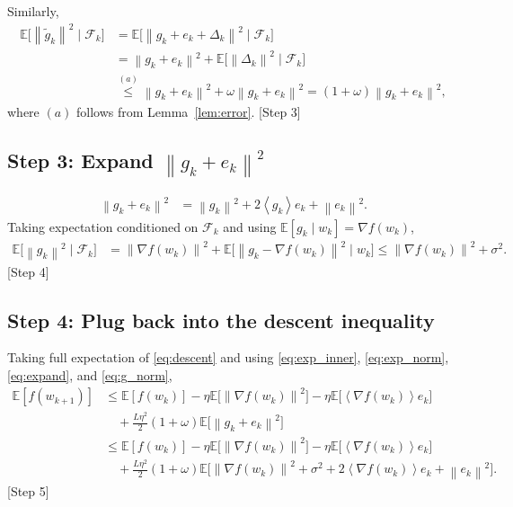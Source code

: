 \documentclass{article}
\newcommand{\E}{\mathbb{E}}
\newcommand{\norm}[1]{\left\lVert #1\right\rVert}
\newcommand{\inner}[1]{\left\langle #1\right\rangle}
\begin{document}
Similarly,
\begin{align}
    \E\!\big[\norm{\tilde g_k}^{2}\mid\mathcal{F}_k\big]
    &=\E\!\big[\norm{g_k+e_k+\Delta_k}^{2}\mid\mathcal{F}_k\big] \nonumber\\
    &=\norm{g_k+e_k}^{2}
      +\E\!\big[\norm{\Delta_k}^{2}\mid\mathcal{F}_k\big]      \nonumber\\
    &\overset{(a)}{\le}\norm{g_k+e_k}^{2}
      +\omega\norm{g_k+e_k}^{2}
      = (1+\omega)\norm{g_k+e_k}^{2},
    \label{eq:exp_norm}
\end{align}
where $(a)$ follows from Lemma~\ref{lem:error}.
[Step 3]

\subsection*{Step 3: Expand $\norm{g_k+e_k}^{2}$}
\begin{align}
    \norm{g_k+e_k}^{2}
    &=\norm{g_k}^{2}+2\inner{g_k}{e_k}+\norm{e_k}^{2}.
    \label{eq:expand}
\end{align}
Taking expectation conditioned on $\mathcal{F}_k$ and using
$\E[g_k\mid w_k]=\nabla f(w_k)$,
\begin{align}
    \E\!\big[\norm{g_k}^{2}\mid\mathcal{F}_k\big]
    &=\norm{\nabla f(w_k)}^{2}
      +\E\!\big[\norm{g_k-\nabla f(w_k)}^{2}\mid w_k\big]
      \le \norm{\nabla f(w_k)}^{2}+\sigma^{2}.
    \label{eq:g_norm}
\end{align}
[Step 4]

\subsection*{Step 4: Plug back into the descent inequality}
Taking full expectation of \eqref{eq:descent} and using \eqref{eq:exp_inner},
\eqref{eq:exp_norm}, \eqref{eq:expand}, and \eqref{eq:g_norm},
\begin{align}
    \E[f(w_{k+1})]
    &\le \E[f(w_k)]
       -\eta\E\!\big[\norm{\nabla f(w_k)}^{2}\big]
       -\eta\E\!\big[\inner{\nabla f(w_k)}{e_k}\big]   \nonumber\\
    &\quad +\frac{L\eta^{2}}{2}(1+\omega)
          \E\!\big[\norm{g_k+e_k}^{2}\big]                                 \nonumber\\
    &\le \E[f(w_k)]
       -\eta\E\!\big[\norm{\nabla f(w_k)}^{2}\big]
       -\eta\E\!\big[\inner{\nabla f(w_k)}{e_k}\big]                        \nonumber\\
    &\quad +\frac{L\eta^{2}}{2}(1+\omega)
          \E\!\big[\norm{\nabla f(w_k)}^{2}+\sigma^{2}
                 +2\inner{\nabla f(w_k)}{e_k}
                 +\norm{e_k}^{2}\big].
    \label{eq:mid}
\end{align}
[Step 5]
\end{document}
